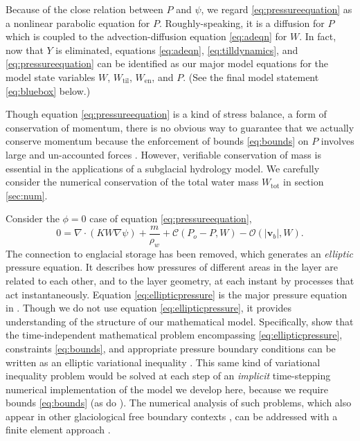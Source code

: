\documentclass[11pt,final]{amsart}
\newcommand\bv{\mathbf{v}}
\newcommand{\Div}{\nabla\cdot}
\newcommand{\grad}{\nabla}
\newcommand{\Wtil}{W_{\text{til}}}
\newcommand{\Wen}{W_{\text{en}}}
\newcommand{\Wtot}{W_{\text{tot}}}
\begin{document}
Because of the close relation between $P$ and $\psi$, we regard \eqref{eq:pressureequation} as a nonlinear parabolic equation for $P$.  Roughly-speaking, it is a diffusion for $P$ which is coupled to the advection-diffusion equation \eqref{eq:adeqn} for $W$.  In fact, now that $Y$ is eliminated, equations \eqref{eq:adeqn}, \eqref{eq:tilldynamics}, and \eqref{eq:pressureequation} can be identified as our major model equations for the model state variables $W$, $\Wtil$, $\Wen$, and $P$.  (See the final model statement \eqref{eq:bluebox} below.)

Though equation \eqref{eq:pressureequation} is a kind of stress balance, a form of conservation of momentum, there is no obvious way to guarantee that we actually conserve momentum because the enforcement of bounds \eqref{eq:bounds} on $P$ involves large and un-accounted forces \citep{Schoofetal2012}.  However, verifiable conservation of mass is essential in the applications of a subglacial hydrology model.  We carefully consider the numerical conservation of the total water mass $\Wtot$ in section \ref{sec:num}.

Consider the $\phi=0$ case of equation \eqref{eq:pressureequation},
\begin{equation}
0 = \Div\left(K W \grad \psi\right) + \frac{m}{\rho_w} + \mathcal{C}(P_o-P,W) - \mathcal{O}(|\bv_b|,W). \label{eq:ellipticpressure}
\end{equation}
The connection to englacial storage has been removed, which generates an \emph{elliptic} pressure equation.  It describes how pressures of different areas in the layer are related to each other, and to the layer geometry, at each instant by processes that act instantaneously.  Equation \eqref{eq:ellipticpressure} is the major pressure equation in \citet[equations (2.12), (4.17a)]{Schoofetal2012}.  Though we do not use equation \eqref{eq:ellipticpressure}, it provides understanding of the structure of our mathematical model.  Specifically, \cite{Schoofetal2012} show that the time-independent mathematical problem encompassing \eqref{eq:ellipticpressure}, constraints \eqref{eq:bounds}, and appropriate pressure boundary conditions can be written as an elliptic variational inequality \citep{KinderlehrerStampacchia}.  This same kind of variational inequality problem would be solved at each step of an \emph{implicit} time-stepping numerical implementation of the model we develop here, because we require bounds \eqref{eq:bounds} (as do \citep{Schoofetal2012}).  The numerical analysis of such problems, which also appear in other glaciological free boundary contexts \citep{SchoofStream,JouvetBueler2012}, can be addressed with a finite element approach \citep{Ciarlet}.
\end{document}
